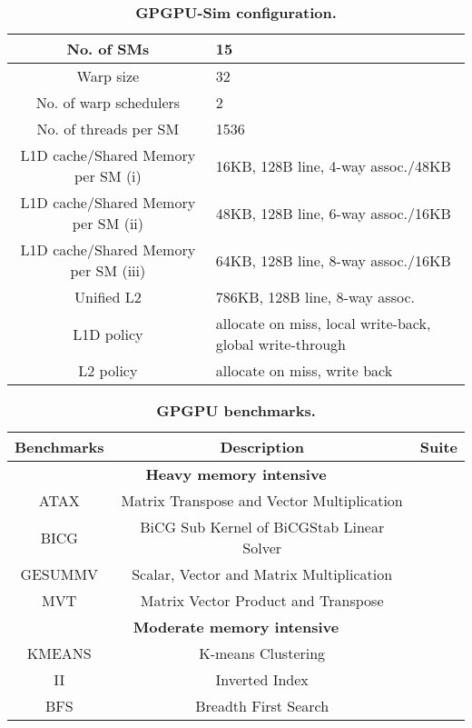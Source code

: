 \documentclass{sigplanconf}
\begin{document}
\begin{table}
\begin{center}
\scriptsize
\begin{tabular}{|c|p{3.5cm}|}
\hline
No. of SMs & 15 \\ \hline
Warp size & 32 \\ \hline
No. of warp schedulers & 2 \\ \hline
No. of threads per SM & 1536 \\ \hline
L1D cache/Shared Memory per SM (i)& 16KB, 128B line, 4-way assoc./48KB \\ \hline
L1D cache/Shared Memory per SM (ii)& 48KB, 128B line, 6-way assoc./16KB \\ \hline
L1D cache/Shared Memory per SM (iii)& 64KB, 128B line, 8-way assoc./16KB \\ \hline
Unified L2 & 786KB, 128B line, 8-way assoc. \\ \hline
L1D policy & allocate on miss, local write-back, global write-through \\ \hline
L2 policy & allocate on miss, write back \\ \hline
\end{tabular}
\end{center}
\caption{\textbf{\label{tab:config}GPGPU-Sim configuration.}}
\end{table}

\begin{table}
\begin{center}
\scriptsize
\begin{tabular}{|c|c|c|}
\hline
Benchmarks & Description & Suite\\ \hline
\multicolumn{3}{|c|}{\textbf{Heavy memory intensive}}\\ \hline
ATAX & Matrix Transpose and Vector Multiplication & \cite{grauer2012auto}\\ \hline
BICG & BiCG Sub Kernel of BiCGStab Linear Solver & \cite{grauer2012auto}\\ \hline
GESUMMV & Scalar, Vector and Matrix Multiplication & \cite{grauer2012auto} \\ \hline
MVT & Matrix Vector Product and Transpose & \cite{grauer2012auto} \\ \hline
\multicolumn{3}{|c|}{\textbf{Moderate memory intensive}}\\ \hline
KMEANS & K-means Clustering & \cite{che2009rodinia} \\ \hline
II & Inverted Index & \cite{he2008mars} \\ \hline
BFS & Breadth First Search & \cite{che2009rodinia} \\ \hline
\end{tabular}
\end{center}
\caption{\textbf{\label{tab:benchmark}GPGPU benchmarks.}}
\end{table}
\end{document}

